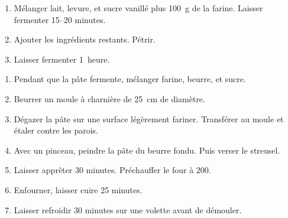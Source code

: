 

\begin{ingredients}
\end{ingredients}



\begin{recipe}
  \begin{enumerate}

  \item Mélanger lait, levure, et sucre vanillé plus 100~g de la
    farine.  Laisser fermenter 15--20 minutes.
    
  \item Ajouter les ingrédients restants.  Pétrir.
    
  \item Laisser fermenter 1~heure.

  \end{enumerate}
\end{recipe}


\begin{ingredients}
\end{ingredients}


\begin{recipe}
  \begin{enumerate}

  \item Pendant que la pâte fermente, mélanger farine, beurre, et sucre.
    
  \item Beurrer un moule à charnière de 25~cm de diamètre.
    
  \item Dégazer la pâte sur une surface légèrement fariner.
    Transférer au moule et étaler contre les parois.
    
  \item Avec un pinceau, peindre la pâte du beurre fondu.  Puis verser le streusel.
    
  \item Laisser apprêter 30 minutes.  Préchauffer le four à 200\degreeC.
    
  \item Enfourner, laisser cuire 25 minutes.
    
  \item Laisser refroidir 30 minutes sur une volette avant de démouler.

  \end{enumerate}
\end{recipe}


